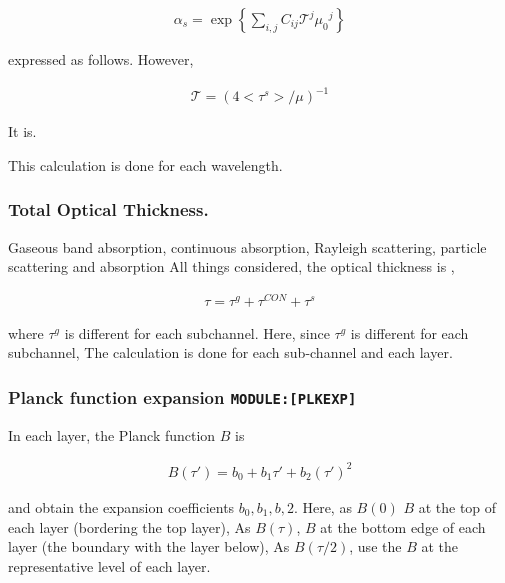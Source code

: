 \begin{eqnarray}
  \alpha_s = \exp\left\{ \sum_{i,j} C_{ij} {\mathcal T}^j {\mu_0}^j \right\}
\end{eqnarray}

expressed as follows. However,

\begin{eqnarray}
 {\mathcal T} = ( 4 <\tau^{s}>/\mu )^{-1}
\end{eqnarray}

It is.

This calculation is done for each wavelength.

\hypertarget{total-optical-thickness.}{%
\subsubsection{Total Optical
Thickness.}\label{total-optical-thickness.}}

Gaseous band absorption, continuous absorption, Rayleigh scattering,
particle scattering and absorption All things considered, the optical
thickness is ,

\begin{eqnarray}
  \tau = \tau^g + \tau^{CON} + \tau^{s}
\end{eqnarray}

where \(\tau^g\) is different for each subchannel. Here, since
\(\tau^g\) is different for each subchannel, The calculation is done for
each sub-channel and each layer.

\hypertarget{planck-function-expansion-moduleplkexp}{%
\subsubsection{\texorpdfstring{Planck function expansion
\texttt{MODULE:{[}PLKEXP{]}}}{Planck function expansion MODULE:{[}PLKEXP{]}}}\label{planck-function-expansion-moduleplkexp}}

In each layer, the Planck function \(B\) is

\begin{eqnarray}
  B(\tau') = b_0 + b_1 \tau' + b_2 \left(\tau'\right)^2
\end{eqnarray}

and obtain the expansion coefficients \(b_0, b_1, b,2\). Here, as
\(B(0)\) \(B\) at the top of each layer (bordering the top layer), As
\(B(\tau)\), \(B\) at the bottom edge of each layer (the boundary with
the layer below), As \(B(\tau/2)\), use the \(B\) at the representative
level of each layer.

